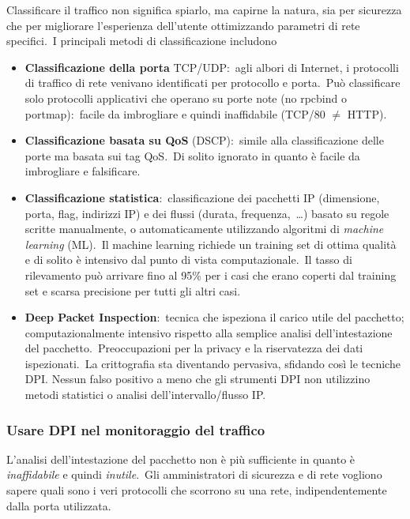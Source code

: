 Classificare il traffico non significa spiarlo, ma capirne la natura, sia per sicurezza che per migliorare l'esperienza dell'utente ottimizzando parametri di rete specifici.\
I principali metodi di classificazione includono
\begin{itemize}
    \item \textbf{Classificazione della porta} TCP/UDP:\ agli albori di Internet, i protocolli di traffico di rete venivano identificati per protocollo e porta.\ Può classificare solo protocolli applicativi che operano su porte note (no rpcbind o portmap):\ facile da imbrogliare e quindi inaffidabile (TCP/80 $\neq$ HTTP).
    \item \textbf{Classificazione basata su QoS} (DSCP):\ simile alla classificazione delle porte ma basata sui tag QoS.\ Di solito ignorato in quanto è facile da imbrogliare e falsificare.\
    \item \textbf{Classificazione statistica}:\ classificazione dei pacchetti IP (dimensione, porta, flag, indirizzi IP) e dei flussi (durata, frequenza,\ \dots) basato su regole scritte manualmente, o automaticamente utilizzando algoritmi di \textit{machine learning} (ML).\ Il machine learning richiede un training set di ottima qualità e di solito è intensivo dal punto di vista computazionale.\
          Il tasso di rilevamento può arrivare fino al 95\% per i casi che erano coperti dal training set e scarsa precisione per tutti gli altri casi.\
    \item \textbf{Deep Packet Inspection}:\ tecnica che ispeziona il carico utile del pacchetto; computazionalmente intensivo rispetto alla semplice analisi dell'intestazione del pacchetto.\ Preoccupazioni per la privacy e la riservatezza dei dati ispezionati.\ La crittografia sta diventando pervasiva, sfidando così le tecniche DPI.
          Nessun falso positivo a meno che gli strumenti DPI non utilizzino metodi statistici o analisi dell'intervallo/flusso IP.
\end{itemize}

\subsubsection{Usare DPI nel monitoraggio del traffico}

L'analisi dell'intestazione del pacchetto non è più sufficiente in quanto è \textit{inaffidabile} e quindi \textit{inutile}.\
Gli amministratori di sicurezza e di rete vogliono sapere quali sono i veri protocolli che scorrono su una rete, indipendentemente dalla porta utilizzata.\

